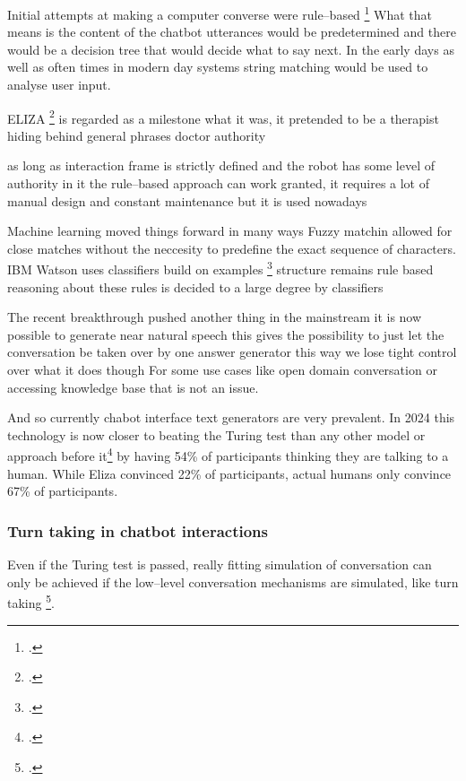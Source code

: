 \documentclass[12pt]{report}
\begin{document}
{\par
Initial attempts at making a computer converse were rule–based \footcite[p.~43]{Sacks1992}
What that means is the content of the chatbot utterances
would be predetermined
and there would be a decision tree that would decide what to say next.
In the early days as well as often times in modern day systems
string matching would be used to analyse user input.

\par
ELIZA \footcite{weizenbaum1966eliza} is regarded as a milestone
what it was, it pretended to be a therapist
hiding behind general phrases
doctor authority

as long as interaction frame is strictly defined and
the robot has some level of authority in it
the rule–based approach can work
granted, it requires a lot of manual design
and constant maintenance
but it is used nowadays

\par
Machine learning moved things forward in many ways
Fuzzy matchin allowed for close matches
without the neccesity to predefine the exact sequence of characters.
IBM Watson uses classifiers build on examples \footcite{building_watson_2010}
structure remains rule based
reasoning about these rules is decided to a large degree by classifiers

\par
The recent breakthrough pushed another thing in the mainstream
it is now possible to generate near natural speech
this gives the possibility to just let the conversation be taken over by one answer generator
this way we lose tight control over what it does though
For some use cases
like open domain conversation or accessing knowledge base
that is not an issue.

\par
And so currently chabot interface text generators are very prevalent.
In 2024 this technology is now closer to beating the Turing test than
any other model or approach before it\footcite{jones2024peopledistinguishgpt4human}
by having 54\% of participants thinking
they are talking to a human.
While Eliza convinced 22\% of participants,
actual humans only convince 67\% of participants.

\subsubsection{Turn taking in chatbot interactions}

\par
Even if the Turing test is passed,
really fitting simulation of conversation
can only be achieved if the low–level conversation mechanisms
are simulated, like turn taking \footcite{optimizing-turn-taking}.

}
\end{document}
